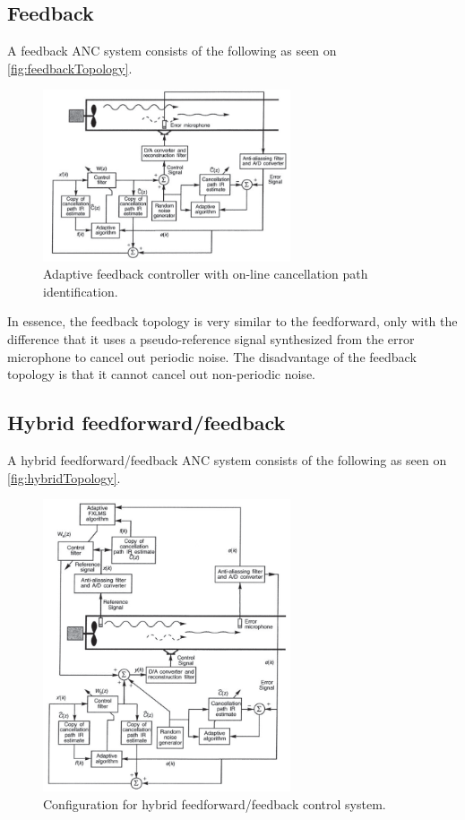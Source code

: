 \pagebreak
\subsection{Feedback}
A feedback ANC system consists of the following as seen on \autoref{fig:feedbackTopology}.
\begin{figure}[H]
	\centering
	\includegraphics[width=0.65\textwidth]{figures/BasicSystem/feedback}
	\caption{Adaptive feedback controller with on-line cancellation path identification. \cite{Hansen2}}
	\label{fig:feedbackTopology}
\end{figure}

In essence, the feedback topology is very similar to the feedforward, only with the difference that it uses a pseudo-reference signal synthesized from the error microphone to cancel out periodic noise. The disadvantage of the feedback topology is that it cannot cancel out non-periodic noise.    



\subsection{Hybrid feedforward/feedback}    
A hybrid feedforward/feedback ANC system consists of the following as seen on \autoref{fig:hybridTopology}.
\begin{figure}[H]
	\centering
	\includegraphics[width=0.65\textwidth]{figures/BasicSystem/hybrid}
	\caption{Configuration for hybrid feedforward/feedback control system. \cite{Hansen2}}
	\label{fig:hybridTopology}
\end{figure}

